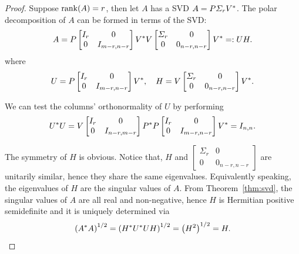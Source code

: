 \documentclass[12pt]{article}
\begin{document}
\begin{proof}
    Suppose $\mathrm{rank}(A) = r$, then let $A$ has a SVD $A = P\varSigma_r V^*$. The polar decomposition of $A$ can be formed in terms of the SVD:
    \begin{equation}
        \notag 
        A = P
        \begin{bmatrix}
            I_r & 0 \\
            0 & I_{m-r,n-r}
        \end{bmatrix}
        V^* V 
        \begin{bmatrix}
            \varSigma_r & 0 \\
            0 & 0_{n-r,n-r}
        \end{bmatrix}
        V^* =: UH.
    \end{equation}
    where 
    \begin{equation}
        \label{eq:expression-of-factors}
        U = P
        \begin{bmatrix}
            I_r & 0 \\
            0 & I_{m-r,n-r}
        \end{bmatrix}
        V^*
        ,\quad 
        H = 
        V 
        \begin{bmatrix}
            \varSigma_r & 0 \\
            0 & 0_{n-r,n-r}
        \end{bmatrix}
        V^*.
    \end{equation}
    
    We can test the columns' orthonormality of $U$ by performing
    \begin{equation}
        \notag 
        U^* U = V
        \begin{bmatrix}
            I_r & 0 \\ 0 & I_{n - r, m-r}
        \end{bmatrix}
        P^* P
        \begin{bmatrix}
            I_r & 0 \\ 0 & I_{m-r,n-r}
        \end{bmatrix}
        V^* = I_{n,n}.
    \end{equation}

    The symmetry of $H$ is obvious. Notice that, $H$ and $\begin{bmatrix} \Sigma_r & 0 \\ 0 & 0_{n-r,n-r}\end{bmatrix}$ are unitarily similar, hence they share the same eigenvalues. Equivalently speaking, the eigenvalues of $H$ are the singular values of $A$. From Theorem~\ref{thm:svd}, the singular values of $A$ are all real and non-negative, hence $H$ is Hermitian positive semidefinite and it is uniquely determined via 
    \begin{equation}
        \left(A^* A\right)^{1/2} = \left(H^* U^* U H\right)^{1/2} = \left(H^2\right)^{1/2} = H.
    \end{equation}


\end{proof}
\end{document}
